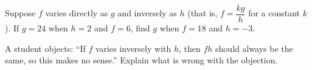 Suppose $f$ varies directly as $g$ and inversely as $h$ (that is, $f=\dfrac{kg}{h}$ for a constant $k$). If $g=24$ when $h=2$ and $f=6$, find $g$ when $f=18$ and $h=-3$.

A student objects: ``If $f$ varies inversely with $h$, then $fh$ should always be the same, so this makes no sense.'' Explain what is wrong with the objection.
